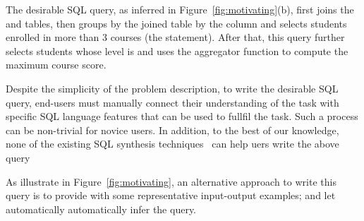 The desirable SQL query, as \ourtool inferred in
Figure~\ref{fig:motivating}(b), first joins the
 and  tables,
then groups by the joined table by the 
column and selects students enrolled in more
than 3 courses (the  statement).
After that, this query further selects students
whose level is  and uses the 
aggregator function to compute the maximum course score.


Despite the simplicity of the problem description,
to write the desirable SQL query, end-users must manually
connect their understanding of the task
with specific SQL language features that can be used to
fullfil the task. Such a process can be non-trivial
for novice users.  In addition, to the best of our knowledge,
none of the existing SQL synthesis techniques~\cite{Zloof:1975,
Tran:2009, DasSarma:2010, abs-1208-2013}
can help uers write the above query

As illustrate in Figure~\ref{fig:motivating}, an alternative
approach to write this query is to provide \ourtool
with some representative input-output examples; and
let \ourtool automatically automatically infer the query.


